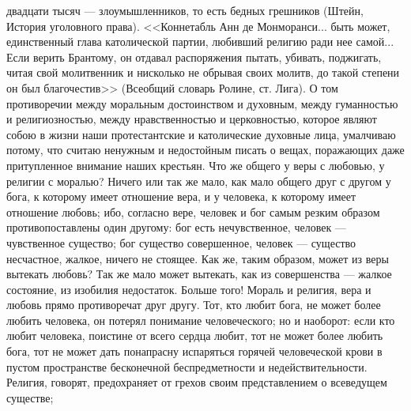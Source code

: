 \documentclass[12pt]{article}
\begin{document}
двадцати тысяч --- злоумышленников, то есть бедных грешников (Штейн, История уголовного права). <<Коннетабль Анн де Монморанси... быть может, единственный глава католической партии, любивший религию ради нее самой... Если верить Брантому, он отдавал распоряжения пытать, убивать, поджигать, читая свой молитвенник и нисколько не обрывая своих молитв, до такой степени он был благочестив>> (Всеобщий словарь Ролине, ст. Лига). О том противоречии между моральным достоинством и духовным, между гуманностью и религиозностью, между нравственностью и церковностью, которое являют собою в жизни наши протестантские и католические духовные лица, умалчиваю потому, что считаю ненужным и недостойным писать о вещах, поражающих даже притупленное внимание наших крестьян. Что же общего у веры с любовью, у религии с моралью? Ничего или так же мало, как мало общего друг с другом у бога, к которому имеет отношение вера, и у человека, к которому имеет отношение любовь; ибо, согласно вере, человек и бог самым резким образом противопоставлены один другому: бог есть нечувственное, человек --- чувственное существо; бог существо совершенное, человек --- существо несчастное, жалкое, ничего не стоящее. Как же, таким образом, может из веры вытекать любовь? Так же мало может вытекать, как из совершенства --- жалкое состояние, из изобилия недостаток. Больше того! Мораль и религия, вера и любовь прямо противоречат друг другу. Тот, кто любит бога, не может более любить человека, он потерял понимание человеческого; но и наоборот: если кто любит человека, поистине от всего сердца любит, тот не может более любить бога, тот не может дать понапрасну испаряться горячей человеческой крови в пустом пространстве бесконечной беспредметности и недействительности. Религия, говорят, предохраняет от грехов своим представлением о всеведущем существе; 
\end{document}
